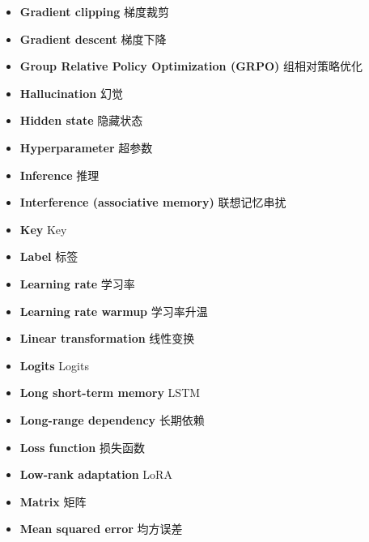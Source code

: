 \begin{itemize}[leftmargin=1.2em,itemsep=2pt,topsep=3pt]
\item {\sffamily\bfseries Gradient clipping} \quad 梯度裁剪\quad {}
\item {\sffamily\bfseries Gradient descent} \quad 梯度下降\quad {}
\item {\sffamily\bfseries Group Relative Policy Optimization (GRPO)} \quad 组相对策略优化\quad {}
\item {\sffamily\bfseries Hallucination} \quad 幻觉\quad {}
\item {\sffamily\bfseries Hidden state} \quad 隐藏状态\quad {}
\item {\sffamily\bfseries Hyperparameter} \quad 超参数\quad {}
\item {\sffamily\bfseries Inference} \quad 推理\quad {}
\item {\sffamily\bfseries Interference (associative memory)} \quad 联想记忆串扰\quad {}
\item {\sffamily\bfseries Key} \quad Key\quad {}
\item {\sffamily\bfseries Label} \quad 标签\quad {}
\item {\sffamily\bfseries Learning rate} \quad 学习率\quad {}
\item {\sffamily\bfseries Learning rate warmup} \quad 学习率升温\quad {}
\item {\sffamily\bfseries Linear transformation} \quad 线性变换\quad {}
\item {\sffamily\bfseries Logits} \quad Logits\quad {}
\item {\sffamily\bfseries Long short-term memory} \quad LSTM\quad {}
\item {\sffamily\bfseries Long-range dependency} \quad 长期依赖\quad {}
\item {\sffamily\bfseries Loss function} \quad 损失函数\quad {}
\item {\sffamily\bfseries Low-rank adaptation} \quad LoRA\quad {}
\item {\sffamily\bfseries Matrix} \quad 矩阵\quad {}
\item {\sffamily\bfseries Mean squared error} \quad 均方误差\quad {}

\end{itemize}
